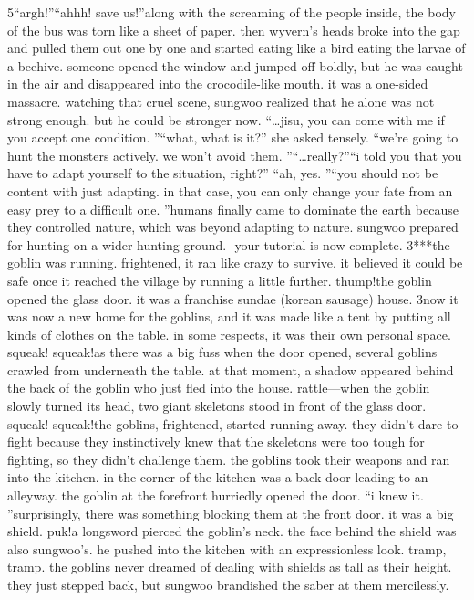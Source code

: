 5“argh!”“ahhh! save us!”along with the screaming of the people inside, the body of the bus was torn like a sheet of paper.
 then wyvern’s heads broke into the gap and pulled them out one by one and started eating like a bird eating the larvae of a beehive.
someone opened the window and jumped off boldly, but he was caught in the air and disappeared into the crocodile-like mouth.
 it was a one-sided massacre.
watching that cruel scene, sungwoo realized that he alone was not strong enough.
but he could be stronger now.
“…jisu, you can come with me if you accept one condition.
”“what, what is it?” she asked tensely.
“we’re going to hunt the monsters actively.
 we won’t avoid them.
”“…really?”“i told you that you have to adapt yourself to the situation, right?”
“ah, yes.
”“you should not be content with just adapting.
 in that case, you can only change your fate from an easy prey to a difficult one.
”humans finally came to dominate the earth because they controlled nature, which was beyond adapting to nature.
sungwoo prepared for hunting on a wider hunting ground.
-your tutorial is now complete.
3***the goblin was running.
 frightened, it ran like crazy to survive.
 it believed it could be safe once it reached the village by running a little further.
thump!the goblin opened the glass door.
 it was a franchise sundae (korean sausage) house.
3now it was now a new home for the goblins, and it was made like a tent by putting all kinds of clothes on the table.
 in some respects, it was their own personal space.
squeak! squeak!as there was a big fuss when the door opened, several goblins crawled from underneath the table.
 at that moment, a shadow appeared behind the back of the goblin who just fled into the house.
rattle—when the goblin slowly turned its head, two giant skeletons stood in front of the glass door.
squeak! squeak!the goblins, frightened, started running away.
 they didn’t dare to fight because they instinctively knew that the skeletons were too tough for fighting, so they didn’t challenge them.
 the goblins took their weapons and ran into the kitchen.
 in the corner of the kitchen was a back door leading to an alleyway.
 the goblin at the forefront hurriedly opened the door.
“i knew it.
”surprisingly, there was something blocking them at the front door.
 it was a big shield.
puk!a longsword pierced the goblin’s neck.
 the face behind the shield was also sungwoo’s.
he pushed into the kitchen with an expressionless look.
tramp, tramp.
the goblins never dreamed of dealing with shields as tall as their height.
 they just stepped back, but sungwoo brandished the saber at them mercilessly.
